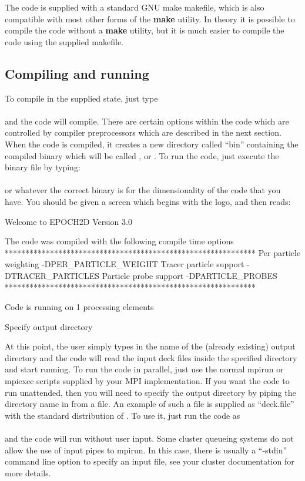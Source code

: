 The code is supplied with a standard GNU make makefile, which is also
compatible with most other forms of the {\bf make} utility. In theory it is
possible to compile the code without a {\bf make} utility, but it is much
easier to compile the code using the supplied makefile.

\subsection{Compiling and running {\EPOCH}}

To compile {\EPOCH} in the supplied state, just type\\
\indent{}\\
and the code will compile. There are certain options within the code which are
controlled by compiler preprocessors which are described in the next
section. When the code is compiled, it creates a new directory called ``bin''
containing the compiled binary which will be called ,
 or . To run the code, just execute the
binary file by typing:\\
\indent{}\\
or whatever the correct binary is for the dimensionality of the code that you
have. You should be given a screen which begins with the {\EPOCH} logo, and then
reads:
\begin{boxverbatim}
 Welcome to EPOCH2D Version 3.0

 The code was compiled with the following compile time options
 *************************************************************
 Per particle weighting -DPER_PARTICLE_WEIGHT
 Tracer particle support -DTRACER_PARTICLES
 Particle probe support -DPARTICLE_PROBES
 *************************************************************

 Code is running on 1 processing elements


 Specify output directory
\end{boxverbatim}

At this point, the user simply types in the name of the (already existing)
output directory and the code will read the input deck files inside the
specified directory and start running. To run the code in parallel, just use
the normal mpirun or mpiexec scripts supplied by your MPI implementation. If
you want the code to run unattended, then you will need to specify the output
directory by piping the directory name in from a file. An example of such a
file is supplied as ``deck.file'' with the standard distribution of {\EPOCH}. To
use it, just run the code as\\
\indent{}\\
and the code will run without user input. Some cluster queueing systems do not
allow the use of input pipes to mpirun. In this case, there is usually a
``-stdin'' command line option to specify an input file, see your cluster
documentation for more details.

